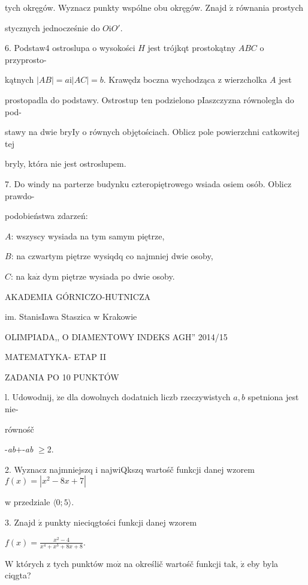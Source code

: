 \documentclass[a4paper,12pt]{article}
\begin{document}
tych okręgów. Wyznacz punkty wspólne obu okręgów. Znajd $\acute{\mathrm{z}}$ równania prostych

stycznych jednocześnie do $O\mathrm{i}O'.$

6. Podstaw4 ostroslupa o wysokości $H$ jest trójkqt prostokątny $ABC$ o przyprosto-

kątnych $|AB| =a\mathrm{i} |AC| =b$. Krawędz$\acute{}$ boczna wychodząca z wierzcholka $A$ jest

prostopadla do podstawy. Ostrostup ten podzielono pIaszczyzna równolegla do pod-

stawy na dwie bryIy o równych objętościach. Oblicz pole powierzchni catkowitej tej

bryly, która nie jest ostroslupem.

7. Do windy na parterze budynku czteropiętrowego wsiada osiem osób. Oblicz prawdo-

podobieństwa zdarzeń:

$A$: wszyscy wysiada na tym samym piętrze,

$B$: na czwartym piętrze wysiqdq co najmniej dwie osoby,

$C$: na $\mathrm{k}\mathrm{a}\dot{\mathrm{z}}$ dym piętrze wysiada po dwie osoby.






AKADEMIA GÓRNICZO-HUTNICZA

im. StanisIawa Staszica w Krakowie

OLIMPIADA,, O DIAMENTOWY INDEKS AGH'' 2014/15

MATEMATYKA- ETAP II

ZADANIA PO 10 PUNKTÓW

l. Udowodnij, $\dot{\mathrm{z}}\mathrm{e}$ dla dowolnych dodatnich liczb rzeczywistych $a, b$ spetniona jest nie-

równośč

-{\it ab}$+$-{\it ab} $\geq$2.

2. Wyznacz najmniejszq i najwiQkszq wartośč funkcji danej wzorem $f(x)=|x^{2}-8x+7|$

w przedziale $\langle 0;5\rangle.$

3. Znajd $\acute{\mathrm{z}}$ punkty nieciqgtości funkcji danej wzorem

$f(x)=\displaystyle \frac{x^{2}-4}{x^{4}+x^{3}+8x+8}.$

$\mathrm{W}$ których z tych punktów $\mathrm{m}\mathrm{o}\dot{\mathrm{z}}$ na określič wartośč funkcji tak, $\dot{\mathrm{z}}$ eby byla ciqgta?
\end{document}
